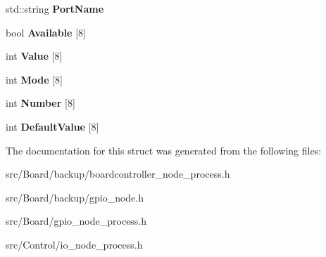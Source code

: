 \begin{DoxyCompactItemize}
std\+::string {\bfseries Port\+Name}
\item 
\mbox{\label{structPort__Info_aaebde6fefc72964c60483b2cb1ed95b4}} 
bool {\bfseries Available} \mbox{[}8\mbox{]}
\item 
\mbox{\label{structPort__Info_a752e1d4ffdadab7c43bc6b2765ac73cf}} 
int {\bfseries Value} \mbox{[}8\mbox{]}
\item 
\mbox{\label{structPort__Info_a74cf228beebe73503f81b71070d27c45}} 
int {\bfseries Mode} \mbox{[}8\mbox{]}
\item 
\mbox{\label{structPort__Info_a43a5bab3c3d81cbbe70d347ab017554e}} 
int {\bfseries Number} \mbox{[}8\mbox{]}
\item 
\mbox{\label{structPort__Info_a7e40b68c7ff710d1e1583c9d56b21532}} 
int {\bfseries Default\+Value} \mbox{[}8\mbox{]}
\end{DoxyCompactItemize}


The documentation for this struct was generated from the following files\+:\begin{DoxyCompactItemize}
\item 
src/\+Board/backup/boardcontroller\+\_\+node\+\_\+process.\+h\item 
src/\+Board/backup/gpio\+\_\+node.\+h\item 
src/\+Board/gpio\+\_\+node\+\_\+process.\+h\item 
src/\+Control/io\+\_\+node\+\_\+process.\+h\end{DoxyCompactItemize}
